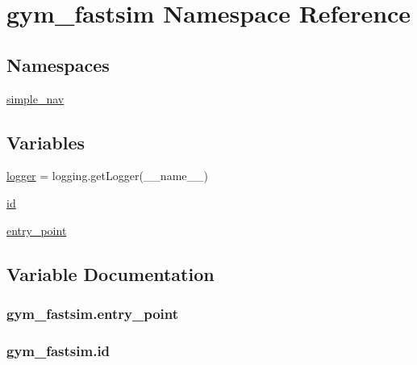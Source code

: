 \hypertarget{namespacegym__fastsim}{}\section{gym\+\_\+fastsim Namespace Reference}
\label{namespacegym__fastsim}
\subsection*{Namespaces}
\begin{DoxyCompactItemize}
\item 
 \hyperlink{namespacegym__fastsim_1_1simple__nav}{simple\+\_\+nav}
\end{DoxyCompactItemize}
\subsection*{Variables}
\begin{DoxyCompactItemize}
\item 
\hyperlink{namespacegym__fastsim_af1af58e03294613590d031d02d55e848}{logger} = logging.\+get\+Logger(\+\_\+\+\_\+name\+\_\+\+\_\+)
\item 
\hyperlink{namespacegym__fastsim_ab2666f200e6b0e3c32505554e5eeead8}{id}
\item 
\hyperlink{namespacegym__fastsim_abf7c57c8cb769105e5e7812f2e2cb4da}{entry\+\_\+point}
\end{DoxyCompactItemize}


\subsection{Variable Documentation}
\subsubsection[{\texorpdfstring{entry\+\_\+point}{entry_point}}]{\setlength{\rightskip}{0pt plus 5cm}gym\+\_\+fastsim.\+entry\+\_\+point}\hypertarget{namespacegym__fastsim_abf7c57c8cb769105e5e7812f2e2cb4da}{}\label{namespacegym__fastsim_abf7c57c8cb769105e5e7812f2e2cb4da}
\subsubsection[{\texorpdfstring{id}{id}}]{\setlength{\rightskip}{0pt plus 5cm}gym\+\_\+fastsim.\+id}\hypertarget{namespacegym__fastsim_ab2666f200e6b0e3c32505554e5eeead8}{}\label{namespacegym__fastsim_ab2666f200e6b0e3c32505554e5eeead8}
